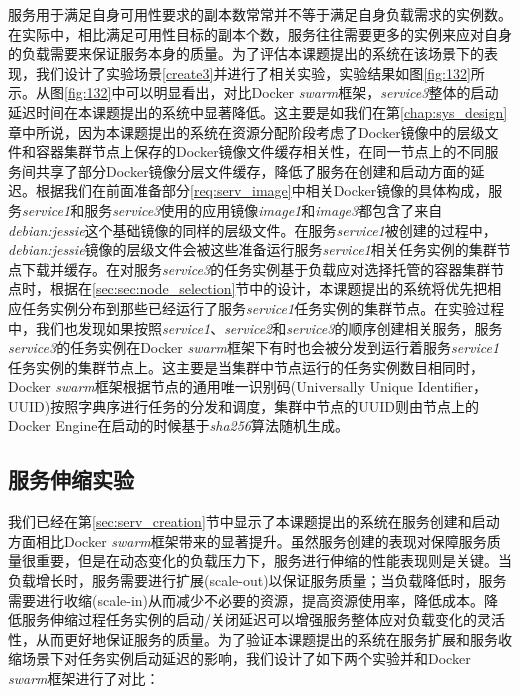 服务用于满足自身可用性要求的副本数常常并不等于满足自身负载需求的实例数。在实际中，相比满足可用性目标的副本个数，服务往往需要更多的实例来应对自身的负载需要来保证服务本身的质量。为了评估本课题提出的系统在该场景下的表现，我们设计了实验场景\ref{create3}并进行了相关实验，实验结果如图\ref{fig:132}所示。从图\ref{fig:132}中可以明显看出，对比Docker \emph{swarm}框架，\emph{service3}整体的启动延迟时间在本课题提出的系统中显著降低。这主要是如我们在第\ref{chap:sys_design}章中所说，因为本课题提出的系统在资源分配阶段考虑了Docker镜像中的层级文件和容器集群节点上保存的Docker镜像文件缓存相关性，在同一节点上的不同服务间共享了部分Docker镜像分层文件缓存，降低了服务在创建和启动方面的延迟。根据我们在前面准备部分\ref{req:serv_image}中相关Docker镜像的具体构成，服务\emph{service1}和服务\emph{service3}使用的应用镜像\emph{image1}和\emph{image3}都包含了来自\emph{debian:jessie}这个基础镜像的同样的层级文件。在服务\emph{service1}被创建的过程中，\emph{debian:jessie}镜像的层级文件会被这些准备运行服务\emph{service1}相关任务实例的集群节点下载并缓存。在对服务\emph{service3}的任务实例基于负载应对选择托管的容器集群节点时，根据在\ref{sec:sec:node_selection}节中的设计，本课题提出的系统将优先把相应任务实例分布到那些已经运行了服务\emph{service1}任务实例的集群节点。在实验过程中，我们也发现如果按照\emph{service1}、\emph{service2}和\emph{service3}的顺序创建相关服务，服务\emph{service3}的任务实例在Docker \emph{swarm}框架下有时也会被分发到运行着服务\emph{service1}任务实例的集群节点上。这主要是当集群中节点运行的任务实例数目相同时，Docker \emph{swarm}框架根据节点的通用唯一识别码(Universally Unique Identifier，UUID)按照字典序进行任务的分发和调度，集群中节点的UUID则由节点上的Docker Engine在启动的时候基于\emph{sha256}算法随机生成。

\subsection{服务伸缩实验}\label{sec:serv_scale}
我们已经在第\ref{sec:serv_creation}节中显示了本课题提出的系统在服务创建和启动方面相比Docker \emph{swarm}框架带来的显著提升。虽然服务创建的表现对保障服务质量很重要，但是在动态变化的负载压力下，服务进行伸缩的性能表现则是关键。当负载增长时，服务需要进行扩展(scale-out)以保证服务质量；当负载降低时，服务需要进行收缩(scale-in)从而减少不必要的资源，提高资源使用率，降低成本。降低服务伸缩过程任务实例的启动/关闭延迟可以增强服务整体应对负载变化的灵活性，从而更好地保证服务的质量。为了验证本课题提出的系统在服务扩展和服务收缩场景下对任务实例启动延迟的影响，我们设计了如下两个实验并和Docker \emph{swarm}框架进行了对比：

